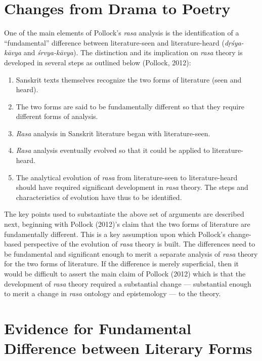 \section*{Changes from Drama to Poetry}

One of the main elements of Pollock’s \textsl{rasa} analysis is the identification of a “fundamental” difference between literature-seen and literature-heard (\textsl{dṛśya-kāvya} and \textsl{śrvya-kāvya}). The distinction and its implication on \textsl{rasa} theory is developed in several steps as outlined below (Pollock, 2012):
\begin{enumerate}
\itemsep=1pt
\item Sanskrit texts themselves recognize the two forms of literature (seen and heard). 
\item The two forms are said to be fundamentally different so that they require different forms of analysis.
\item \textsl{Rasa }analysis in Sanskrit literature began with literature-seen.
\item \textsl{Rasa }analysis eventually evolved so that it could be applied to literature-heard.
\item The analytical evolution of \textsl{rasa} from literature-seen to literature-heard should have required significant development in \textsl{rasa} theory. The steps and characteristics of evolution have thus to be identified.
\end{enumerate}

The key points used to substantiate the above set of arguments are described next, beginning with Pollock (2012)’s claim that the two forms of literature are fundamentally different. This is a key assumption upon which Pollock’s change-based perspective of the evolution of \textsl{rasa} theory is built. The differences need to be fundamental and significant enough to merit a separate analysis of \textsl{rasa} theory for the two forms of literature. If the difference is merely superficial, then it would be difficult to assert the main claim of Pollock (2012) which is that the development of \textsl{rasa} theory required a substantial change --- substantial enough to merit a change in \textsl{rasa }ontology and epistemology --- to the theory. 

\section*{Evidence for Fundamental Difference between Literary Forms}


